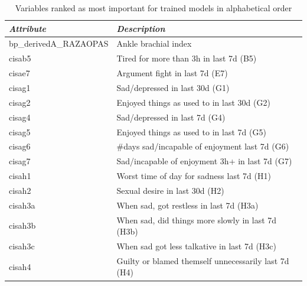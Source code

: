 \begin{table}[H]
    \renewcommand{\arraystretch}{0.65} %
    \caption{Variables ranked as most important for trained models in alphabetical order}
    \begin{center}
        \begin{tabular}{l|l}
            \textit{Attribute}                & \textit{Description}                                  \\
            \hline
            \hline
            bp\_derivedA\_RAZAOPAS            & Ankle brachial index                                  \\
            cisab5                            & Tired for more than 3h in last 7d (B5)                \\
            cisae7                            & Argument fight in last 7d (E7)                        \\
            cisag1                            & Sad/depressed in last 30d (G1)                        \\
            cisag2                            & Enjoyed things as used to in last 30d (G2)            \\
            cisag4                            & Sad/depressed in last 7d (G4)                         \\
            cisag5                            & Enjoyed things as used to in last 7d (G5)             \\
            cisag6                            & \#days sad/incapable of enjoyment last 7d (G6)        \\
            cisag7                            & Sad/incapable of enjoyment 3h+ in last 7d (G7)        \\
            cisah1                            & Worst time of day for sadness last 7d (H1)            \\
            cisah2                            & Sexual desire in last 30d (H2)                        \\
            cisah3a                           & When sad, got restless in last 7d (H3a)               \\
            cisah3b                           & When sad, did things more slowly in last 7d (H3b)     \\
            cisah3c                           & When sad got less talkative in last 7d (H3c)          \\
            cisah4                            & Guilty or blamed themself unnecessarily last 7d (H4)  \\

\end{tabular}
\end{center}
\end{table}
